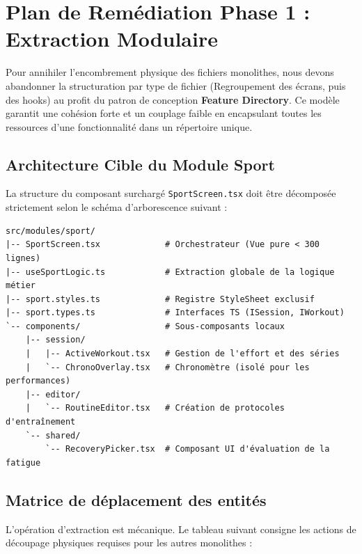 \documentclass[11pt, a4paper]{article}
\begin{document}
\newpage

\section{Plan de Remédiation Phase 1 : Extraction Modulaire}

Pour annihiler l'encombrement physique des fichiers monolithes, nous devons abandonner la structuration par type de fichier (Regroupement des écrans, puis des hooks) au profit du patron de conception \textbf{Feature Directory}. Ce modèle garantit une cohésion forte et un couplage faible en encapsulant toutes les ressources d'une fonctionnalité dans un répertoire unique.

\subsection{Architecture Cible du Module Sport}
La structure du composant surchargé \texttt{SportScreen.tsx} doit être décomposée strictement selon le schéma d'arborescence suivant :

\begin{verbatim}
src/modules/sport/
|-- SportScreen.tsx             # Orchestrateur (Vue pure < 300 lignes)
|-- useSportLogic.ts            # Extraction globale de la logique métier
|-- sport.styles.ts             # Registre StyleSheet exclusif
|-- sport.types.ts              # Interfaces TS (ISession, IWorkout)
`-- components/                 # Sous-composants locaux
    |-- session/
    |   |-- ActiveWorkout.tsx   # Gestion de l'effort et des séries
    |   `-- ChronoOverlay.tsx   # Chronomètre (isolé pour les performances)
    |-- editor/
    |   `-- RoutineEditor.tsx   # Création de protocoles d'entraînement
    `-- shared/
        `-- RecoveryPicker.tsx  # Composant UI d'évaluation de la fatigue
\end{verbatim}

\subsection{Matrice de déplacement des entités}
L'opération d'extraction est mécanique. Le tableau suivant consigne les actions de découpage physiques requises pour les autres monolithes :
\end{document}
